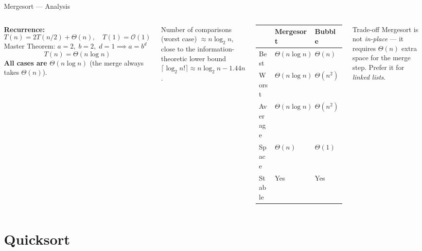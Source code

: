 \documentclass[aspectratio=169]{beamer}
\begin{document}
\begin{frame}[shrink=12]{Mergesort — Analysis}
  \begin{columns}[T]
      \textbf{Recurrence:}
      \[
        T(n) = 2T(n/2) + \Theta(n),\quad T(1)=\mathcal{O}(1)
      \]
      Master Theorem: $a=2,\;b=2,\;d=1 \implies a=b^d$
      \[
        \boxed{T(n) = \Theta(n\log n)}
      \]
      \vspace{0.2em}
      \textbf{All cases are $\Theta(n\log n)$} (the merge always takes $\Theta(n)$).

      \vspace{0.3em}
      Number of comparisons (worst case) $\approx n\log_2 n$, close to the
      information-theoretic lower bound $\lceil\log_2 n!\rceil \approx n\log_2 n - 1.44n$.
      \begin{tabular}{lll}
        \toprule
        & \textbf{Mergesort} & \textbf{Bubble} \\
        \midrule
        Best     & $\Theta(n\log n)$ & $\Theta(n)$ \\
        Worst    & $\Theta(n\log n)$ & $\Theta(n^2)$ \\
        Average  & $\Theta(n\log n)$ & $\Theta(n^2)$ \\
        Space    & $\Theta(n)$ & $\Theta(1)$ \\
        Stable   & Yes & Yes \\
        \bottomrule
      \end{tabular}
      \vspace{0.3em}
      \begin{alertblock}{Trade-off}
        Mergesort is not \emph{in-place} — it requires
        $\Theta(n)$ extra space for the merge step.
        Prefer it for \emph{linked lists}.
      \end{alertblock}
  \end{columns}
\end{frame}

\section{Quicksort}
\end{document}

